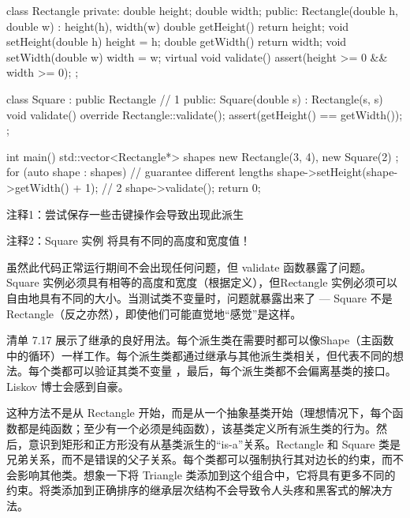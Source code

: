 
\begin{cpp}
class Rectangle {
private:
  double height;
  double width;
public:
  Rectangle(double h, double w) : height(h), width(w) {}
  double getHeight() { return height; }
  void setHeight(double h) { height = h; }
  double getWidth() { return width; }
  void setWidth(double w) { width = w; }
  virtual void validate() { assert(height >= 0 && width >= 0); }
};

class Square : public Rectangle { // 1
public:
  Square(double s) : Rectangle(s, s) {}
  void validate() override {
    Rectangle::validate();
    assert(getHeight() == getWidth());
  }
};

int main() {
  std::vector<Rectangle*> shapes { new Rectangle(3, 4),
      new Square(2) };
  for (auto shape : shapes) {
    // guarantee different lengths
    shape->setHeight(shape->getWidth() + 1); // 2
    shape->validate();
  }
  return 0;
}
\end{cpp}

{\footnotesize
注释1：尝试保存一些击键操作会导致出现此派生

注释2：Square 实例 将具有不同的高度和宽度值！
}

虽然此代码正常运行期间不会出现任何问题，但 validate 函数暴露了问题。Square 实例必须具有相等的高度和宽度（根据定义），但Rectangle 实例必须可以自由地具有不同的大小。当测试类不变量时，问题就暴露出来了 — Square 不是Rectangle（反之亦然），即使他们可能直觉地“感觉”是这样。


清单 7.17 展示了继承的良好用法。每个派生类在需要时都可以像Shape（主函数中的循环）一样工作。每个派生类都通过继承与其他派生类相关，但代表不同的想法。每个类都可以验证其类不变量 ，最后，每个派生类都不会偏离基类的接口。Liskov 博士会感到自豪。

这种方法不是从 Rectangle 开始，而是从一个抽象基类开始（理想情况下，每个函数都是纯函数；至少有一个必须是纯函数），该基类定义所有派生类的行为。然后，意识到矩形和正方形没有从基类派生的“is-a”关系。Rectangle 和 Square 类是兄弟关系，而不是错误的父子关系。每个类都可以强制执行其对边长的约束，而不会影响其他类。想象一下将 Triangle 类添加到这个组合中，它将具有更多不同的约束。将类添加到正确排序的继承层次结构不会导致令人头疼和黑客式的解决方法。


